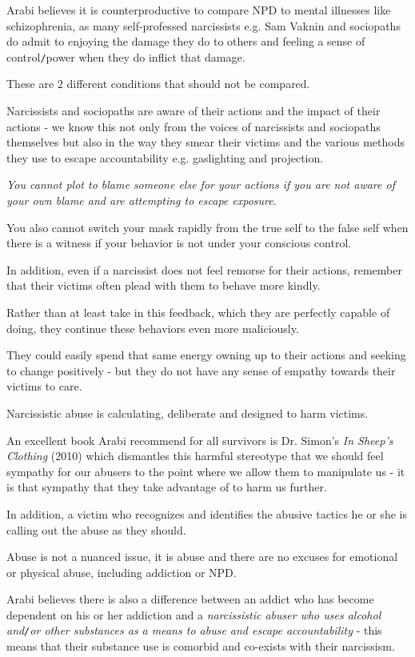 \documentclass[oneside]{book}
\numberwithin{equation}{section}
\begin{document}
Arabi believes it is counterproductive to compare NPD to mental illnesses like schizophrenia, as many self-professed narcissists e.g. Sam Vaknin and sociopaths do admit to enjoying the damage they do to others and feeling a sense of control\texttt{/}power when they do inflict that damage.

These are 2 different conditions that should not be compared.

%
Narcissists and sociopaths are aware of their actions and the impact of their actions - we know this not only from the voices of narcissists and sociopaths themselves but also in the way they smear their victims and the various methods they use to escape accountability e.g. gaslighting and projection.

\textit{You cannot plot to blame someone else for your actions if you are not aware of your own blame and are attempting to escape exposure}.

You also cannot switch your mask rapidly from the true self to the false self when there is a witness if your behavior is not under your conscious control.

%
In addition, even if a narcissist does not feel remorse for their actions, remember that their victims often plead with them to behave more kindly.

Rather than at least take in this feedback, which they are perfectly capable of doing, they continue these behaviors even more maliciously.

They could easily spend that same energy owning up to their actions and seeking to change positively - but they do not have any sense of empathy towards their victims to care.

Narcissistic abuse is calculating, deliberate and designed to harm victims.

An excellent book Arabi recommend for all survivors is Dr. Simon's \textit{In Sheep's Clothing} (2010) which dismantles this harmful stereotype that we should feel sympathy for our abusers to the point where we allow them to manipulate us - it is that sympathy that they take advantage of to harm us further.

In addition, a victim who recognizes and identifies the abusive tactics he or she is calling out the abuse as they should.

Abuse is not a nuanced issue, it is abuse and there are no excuses for emotional or physical abuse, including addiction or NPD.

%
Arabi believes there is also a difference between an addict who has become dependent on his or her addiction and a \textit{narcissistic abuser who uses alcohol and\texttt{/}or other substances as a means to abuse and escape accountability} - this means that their substance use is comorbid and co-exists with their narcissism.
\end{document}
